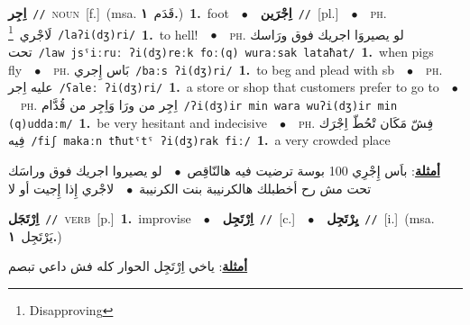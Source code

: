 \documentclass[10pt,a4paper,twoside]{article} %
\begin{document}
\begin{multicols}{2}
{\setlength\topsep{0pt}\textbf{\foreignlanguage{arabic}{اِجِر}}\ {\color{gray}\texttt{//}\color{black}}\ \textsc{noun}\ [f.]\ \color{gray}(msa. \foreignlanguage{arabic}{قَدَم}~\foreignlanguage{arabic}{\textbf{١.}})\color{black}\ \textbf{1.}~foot\ \ $\bullet$\ \ \setlength\topsep{0pt}\textbf{\foreignlanguage{arabic}{اِجْرَين}}\ {\color{gray}\texttt{//}\color{black}}\ [pl.]\ \ $\bullet$\ \ \textsc{ph.} \color{gray} \foreignlanguage{arabic}{لَاجْري}\color{black}\ \footnote{Disapproving}\ {\color{gray}\texttt{/{\sffamily laʔi(dʒ)ri}/}\color{black}}\ \textbf{1.}~to hell!\ \ $\bullet$\ \ \textsc{ph.} \color{gray} \foreignlanguage{arabic}{لو يصيروَا اجريك فوق ورَاسك تحت}\color{black}\ {\color{gray}\texttt{/{\sffamily law jsˤiːruː ʔi(dʒ)reːk foː(q) wuraːsak lataħat}/}\color{black}}\ \textbf{1.}~when pigs fly\ \ $\bullet$\ \ \textsc{ph.} \color{gray} \foreignlanguage{arabic}{بَاس إِجري}\color{black}\ {\color{gray}\texttt{/{\sffamily baːs ʔi(dʒ)ri}/}\color{black}}\ \textbf{1.}~to beg and plead with sb\ \ $\bullet$\ \ \textsc{ph.} \color{gray} \foreignlanguage{arabic}{عليه اِجر}\color{black}\ {\color{gray}\texttt{/{\sffamily ʕaleː ʔi(dʒ)ri}/}\color{black}}\ \textbf{1.}~a store or shop that customers prefer to go to\ \ $\bullet$\ \ \textsc{ph.} \color{gray} \foreignlanguage{arabic}{اِجِر من ورَا وَاِجِر من قُدَّام}\color{black}\ {\color{gray}\texttt{/{\sffamily ʔi(dʒ)ir min wara wuʔi(dʒ)ir min (q)uddaːm}/}\color{black}}\ \textbf{1.}~be very hesitant and indecisive\ \ $\bullet$\ \ \textsc{ph.} \color{gray} \foreignlanguage{arabic}{فِشّ مَكَان تْحُطّ اِجْرَك فِيه}\color{black}\ {\color{gray}\texttt{/{\sffamily fiʃ makaːn tħutˤtˤ ʔi(dʒ)rak fiː}/}\color{black}}\ \textbf{1.}~a very crowded place\  \begin{flushright}\color{gray}\foreignlanguage{arabic}{\textbf{\underline{\foreignlanguage{arabic}{أمثلة}}}: باَس إِجْرِي 100 بوسة ترضيت فيه هالنّاقِص\ $\bullet$\ \  لو يصيروا اجريك فوق وراسَك تحت مش رح أخطبلك هالكرنيبة بنت الكرنيبة\ $\bullet$\ \  لاجْري إِذا إِجيت أو لا}\end{flushright}\color{black}} \vspace{2mm}

{\setlength\topsep{0pt}\textbf{\foreignlanguage{arabic}{اِرْتَجَل}}\ {\color{gray}\texttt{//}\color{black}}\ \textsc{verb}\ [p.]\ \textbf{1.}~improvise\ \ $\bullet$\ \ \setlength\topsep{0pt}\textbf{\foreignlanguage{arabic}{اِرْتَجِل}}\ {\color{gray}\texttt{//}\color{black}}\ [c.]\ \ $\bullet$\ \ \setlength\topsep{0pt}\textbf{\foreignlanguage{arabic}{يِرْتَجِل}}\ {\color{gray}\texttt{//}\color{black}}\ [i.]\ \color{gray}(msa. \foreignlanguage{arabic}{يَرْتَجِل}~\foreignlanguage{arabic}{\textbf{١.}})\color{black}\  \begin{flushright}\color{gray}\foreignlanguage{arabic}{\textbf{\underline{\foreignlanguage{arabic}{أمثلة}}}: ياخي اِرْتَجِل الحوار كله فش داعي تبصم}\end{flushright}\color{black}} \vspace{2mm}


\end{multicols}
\end{document}
